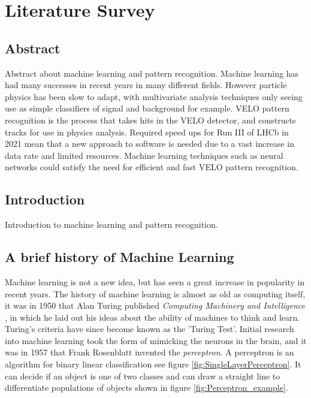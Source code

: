 

\chapter{Literature Survey}  %


\graphicspath{{Figs/}}



\section{Abstract} %
Abstract about machine learning and pattern recognition.
Machine learning has had many successes in recent years in many different fields. However particle physics has been slow to adapt, with multivariate analysis techniques only seeing use as simple classifiers of signal and background for example. VELO pattern recognition is the process that takes hits in the VELO detector, and constructs tracks for use in physics analysis. Required speed ups for Run III of LHCb in 2021 mean that a new approach to software is needed due to a vast increase in data rate and limited resources. Machine learning techniques such as neural networks could satisfy the need for efficient and fast VELO pattern recognition.


\section{Introduction} %
Introduction to machine learning and pattern recognition.


\section{A brief history of Machine Learning}  %
Machine learning is not a new idea, but has seen a great increase in popularity in recent years. The history of machine learning is almost as old as computing itself, it was in 1950 that Alan Turing published \textit{Computing Machinery and Intelligence} \cite{TURING1950I.COMPUTINGINTELLIGENCE}, in which he laid out his ideas about the ability of machines to think and learn. Turing's criteria have since become known as the 'Turing Test'. Initial research into machine learning took the form of mimicking the neurons in the brain, and it was in 1957 that Frank Rosenblatt invented the \textit{perceptron}. A perceptron is an algorithm for binary linear classification see figure \ref{fig:SingleLayerPerceptron}. It can decide if an object is one of two classes and can draw a straight line to differentiate populations of objects shown in figure \ref{fig:Perceptron_example}.  

